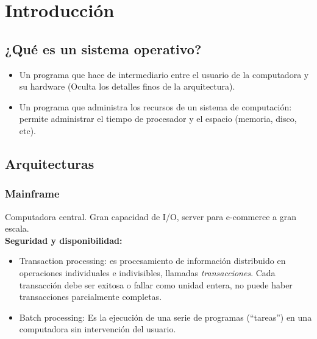 \documentclass[a4paper, twoside]{article}
\newcommand{\rutapaquetes}{./paquetes-apunte}
\begin{document}
\maketitle %

\tableofcontents %



\section{Introducción}

\subsection{¿Qué es un sistema operativo?}

\begin{itemize}
  \item Un programa que hace de intermediario entre el usuario de la
  computadora y su hardware (Oculta los detalles finos de la arquitectura).

  \item Un programa que administra los recursos de un sistema de computación:
  permite administrar el tiempo de procesador y el espacio (memoria, disco,
  etc).
\end{itemize}

\subsection{Arquitecturas}

\subsubsection{Mainframe}

Computadora central. Gran capacidad de I/O, server para e-commerce a gran escala.\\

\textbf{Seguridad y disponibilidad:}

\begin{itemize}
  \item Transaction processing: es procesamiento de información distribuido en
  operaciones individuales e indivisibles, llamadas \emph{transacciones}.
  Cada transacción debe ser exitosa o fallar como unidad entera, no puede haber
  transacciones parcialmente completas.

  \item Batch processing: Es la ejecución de una serie de programas
  (``tareas'') en una computadora sin intervención del usuario.
\end{itemize}
\end{document}
